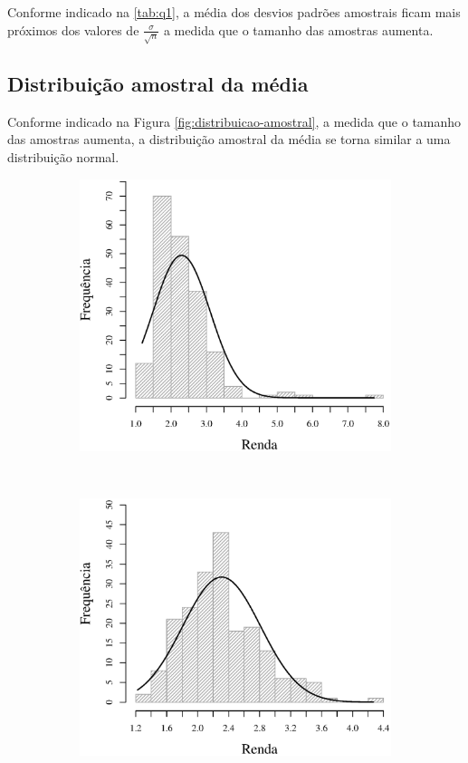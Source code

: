 	Conforme indicado na \autoref{tab:q1}, a média dos desvios padrões
	amostrais ficam mais próximos dos valores de $\frac{\sigma}{\sqrt{n}}$ a
	medida que o tamanho das amostras aumenta.

\subsection{Distribuição amostral da média}

	Conforme indicado na Figura \ref{fig:distribuicao-amostral}, a medida
	que o tamanho das amostras aumenta, a distribuição amostral da média se
	torna similar a uma distribuição normal.

\begin{figure}
	\centering
	\begin{subfigure}[b]{0.48\textwidth}
		\includegraphics[width=\textwidth]{plots/histogram_renda_n4.eps}
		\caption{}
		\label{fig:m4}
	\end{subfigure}
	~
	\begin{subfigure}[b]{0.48\textwidth}
		\includegraphics[width=\textwidth]{plots/histogram_renda_n8.eps}

\end{subfigure}
\end{figure}

